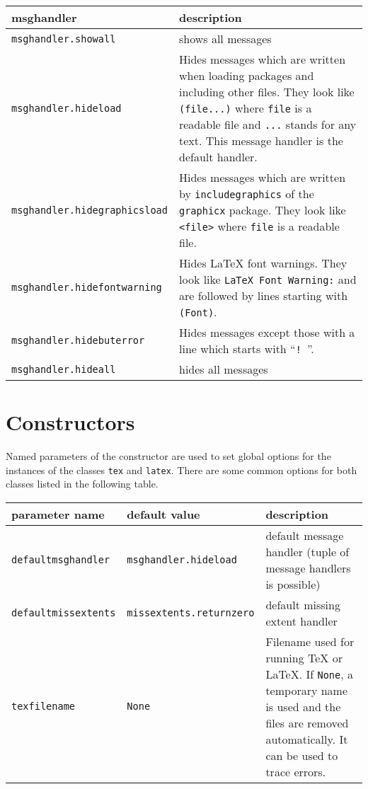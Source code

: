 \begin{description}
\smallskip
\begin{tabularx}{\linewidth}{l>{\raggedright\arraybackslash}X}
msghandler&description\\
\hline
\texttt{msghandler.showall}&shows all messages\\
\texttt{msghandler.hideload}&Hides messages which are written when loading
packages and including other files. They look like \texttt{(file...)}
where \texttt{file} is a readable file and \texttt{...} stands for any
text. This message handler is the default handler.\\
\texttt{msghandler.hidegraphicsload}&Hides messages which are written by
\texttt{includegraphics} of the \texttt{graphicx} package. They look like
\texttt{<file>} where \texttt{file} is a readable file.\\
\texttt{msghandler.hidefontwarning}&Hides \LaTeX{} font warnings. They
look like \texttt{LaTeX Font Warning:} and are followed by lines starting
with \texttt{(Font)}.\\
\texttt{msghandler.hidebuterror}&Hides messages except those
with a line which starts with ``\texttt{! }''.\\
\texttt{msghandler.hideall}&hides all messages\\
\end{tabularx}
\end{description}


\section{Constructors}
Named parameters of the constructor are used to set global options for
the instances of the classes \verb|tex| and \verb|latex|.
There are some common options for both classes listed in the following
table.

\smallskip
\begin{tabularx}{\linewidth}{ll>{\raggedright\arraybackslash}X}
parameter name&default value&description\\
\hline
\texttt{defaultmsghandler}&\texttt{msghandler.hideload}&default
message handler (tuple of message handlers is possible)\\
\texttt{defaultmissextents}&\texttt{missextents.returnzero}&default missing extent handler\\
\texttt{texfilename}&\texttt{None}&Filename used for running \TeX{} or
\LaTeX. If \texttt{None}, a temporary name is used and the files are
removed automatically. It can be used to trace errors.\\
\end{tabularx}
\smallskip

